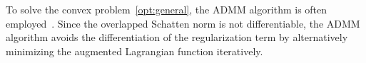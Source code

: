 To solve the convex problem~\eqref{opt:general}, the ADMM algorithm is often
employed~\cite{boyd2011distributed,tomioka2010estimation,
  tomioka2011statistical}.  Since the overlapped Schatten norm is not
differentiable, the ADMM algorithm avoids the differentiation of the
regularization term by alternatively minimizing the augmented
Lagrangian function iteratively.



